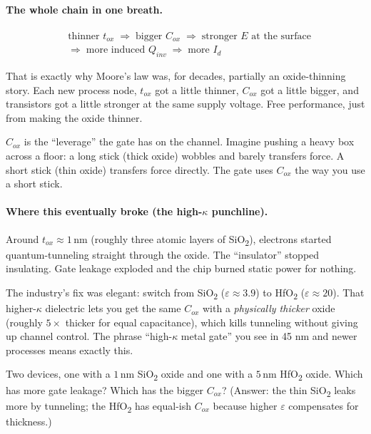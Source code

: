 \documentclass[11pt]{article}
\begin{document}
\paragraph{The whole chain in one breath.}
\begin{align*}
&\text{thinner } t_{ox} \;\Rightarrow\; \text{bigger } C_{ox} \;\Rightarrow\; \text{stronger } E \text{ at the surface} \\
&\Rightarrow\; \text{more induced } Q_{inv} \;\Rightarrow\; \text{more } I_d
\end{align*}

That is exactly why Moore's law was, for decades, partially an oxide-thinning story. Each new process node, $t_{ox}$ got a little thinner, $C_{ox}$ got a little bigger, and transistors got a little stronger at the same supply voltage. Free performance, just from making the oxide thinner.

\begin{hook}
$C_{ox}$ is the ``leverage'' the gate has on the channel. Imagine pushing a heavy box across a floor: a long stick (thick oxide) wobbles and barely transfers force. A short stick (thin oxide) transfers force directly. The gate uses $C_{ox}$ the way you use a short stick.
\end{hook}

\paragraph{Where this eventually broke (the high-$\kappa$ punchline).} Around $t_{ox} \approx 1\,\text{nm}$ (roughly three atomic layers of SiO\textsubscript{2}), electrons started quantum-tunneling straight through the oxide. The ``insulator'' stopped insulating. Gate leakage exploded and the chip burned static power for nothing.

The industry's fix was elegant: switch from SiO\textsubscript{2} ($\varepsilon \approx 3.9$) to HfO\textsubscript{2} ($\varepsilon \approx 20$). That higher-$\kappa$ dielectric lets you get the same $C_{ox}$ with a \emph{physically thicker} oxide (roughly $5\times$ thicker for equal capacitance), which kills tunneling without giving up channel control. The phrase ``high-$\kappa$ metal gate'' you see in 45 nm and newer processes means exactly this.

\begin{gut}
Two devices, one with a $1\,\text{nm}$ SiO\textsubscript{2} oxide and one with a $5\,\text{nm}$ HfO\textsubscript{2} oxide. Which has more gate leakage? Which has the bigger $C_{ox}$? (Answer: the thin SiO\textsubscript{2} leaks more by tunneling; the HfO\textsubscript{2} has equal-ish $C_{ox}$ because higher $\varepsilon$ compensates for thickness.)
\end{gut}
\end{document}
